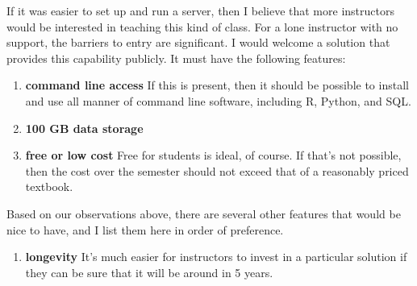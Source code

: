 \documentclass[12pt]{article}
\begin{document}
If it was easier to set up and run a server, then I believe that more instructors would be interested in teaching this kind of class.
For a lone instructor with no support, the barriers to entry are significant.
I would welcome a solution that provides this capability publicly.
It must have the following features:
\begin{enumerate}
\item \textbf{command line access} If this is present, then it should be possible to install and use all manner of command line software, including R, Python, and SQL.
\item \textbf{100 GB data storage} 
\item \textbf{free or low cost} Free for students is ideal, of course.
    If that's not possible, then the cost over the semester should not exceed that of a reasonably priced textbook.
\end{enumerate}
Based on our observations above, there are several other features that would be nice to have, and I list them here in order of preference.

\begin{enumerate}
\item \textbf{longevity} It's much easier for instructors to invest in a particular solution if they can be sure that it will be around in 5 years.
\end{enumerate}



\end{document}
